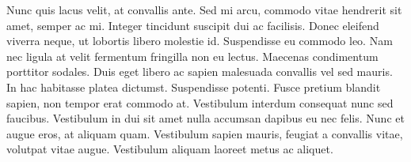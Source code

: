 Nunc quis lacus velit, at convallis ante. Sed mi arcu, commodo vitae hendrerit sit amet, semper ac mi. Integer tincidunt suscipit dui ac facilisis. Donec eleifend viverra neque, ut lobortis libero molestie id. Suspendisse eu commodo leo. Nam nec ligula at velit fermentum fringilla non eu lectus. Maecenas condimentum porttitor sodales. Duis eget libero ac sapien malesuada convallis vel sed mauris. In hac habitasse platea dictumst. Suspendisse potenti. Fusce pretium blandit sapien, non tempor erat commodo at. Vestibulum interdum consequat nunc sed faucibus. Vestibulum in dui sit amet nulla accumsan dapibus eu nec felis. Nunc et augue eros, at aliquam quam. Vestibulum sapien mauris, feugiat a convallis vitae, volutpat vitae augue. Vestibulum aliquam laoreet metus ac aliquet.